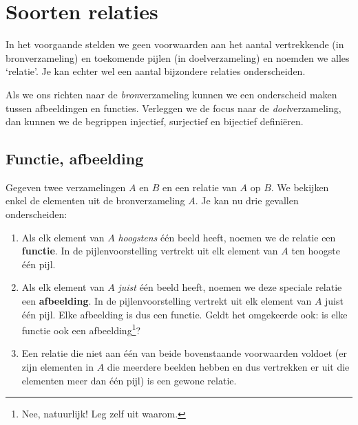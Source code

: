 \section{Soorten relaties} \label{subsec:soortenrelaties}
In het voorgaande stelden we geen voorwaarden aan het aantal vertrekkende (in bronverzameling) en toekomende pijlen (in doelverzameling) en noemden we alles `relatie'. Je kan echter wel een aantal bijzondere relaties onderscheiden. 

Als we ons richten naar de \emph{bron}verzameling kunnen we een onderscheid maken tussen afbeeldingen en functies. Verleggen we de focus naar de \emph{doel}ver\-za\-me\-ling, dan kunnen we de begrippen injectief, surjectief en bijectief definiëren.

\subsection{Functie, afbeelding} \label{subsec:functies}
Gegeven twee verzamelingen $A$ en $B$ en een relatie van $A$ op $B$. We bekijken enkel de elementen uit de bronverzameling $A$. Je kan nu drie gevallen onderscheiden:
\begin{enumerate}
  \item Als elk element van $A$ \emph{hoogstens} één beeld heeft, noemen we de relatie een \textbf{functie}. In de pijlenvoorstelling vertrekt uit elk element van $A$ ten hoogste één pijl.
  \item Als elk element van $A$ \emph{juist} één beeld heeft, noemen we deze speciale relatie een \textbf{afbeelding}.
        In de pijlenvoorstelling vertrekt uit elk element van $A$ juist één pijl. Elke afbeelding is dus een functie. Geldt het omgekeerde ook: is elke functie ook een afbeelding\footnote{Nee, natuurlijk! Leg zelf uit waarom.}?
  \item Een relatie die niet aan één van beide bovenstaande voorwaarden voldoet (er zijn elementen in $A$ die meerdere beelden hebben en dus vertrekken er uit die elementen meer dan één pijl) is een gewone relatie.
\end{enumerate}

